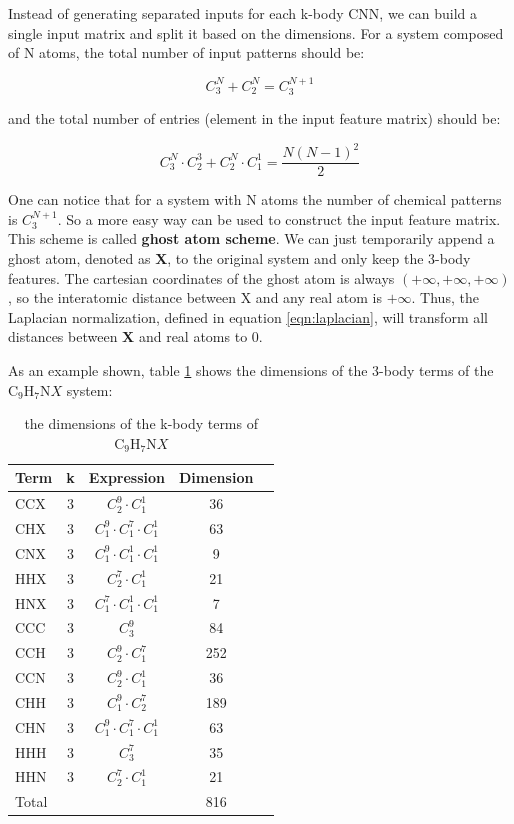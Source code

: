 \noindent Instead of generating separated inputs for each k-body CNN, we can build a single input 
matrix and split it based on the dimensions. For a system composed of N atoms, the total number
of input patterns should be:

\begin{equation}\label{eqn:cn3_cn2}
C^N_3 + C^N_2 = C^{N+1}_3
\end{equation}

\noindent and the total number of entries (element in the input feature matrix) should be:

\begin{equation}
C^N_3 \cdot C^3_2 + C^N_2 \cdot C^1_1 = \frac{N(N-1)^2}{2}
\end{equation}

One can notice that for a system with N atoms the number of chemical patterns is $C^{N+1}_3$.
So a more easy way can be used to construct the input feature matrix. This scheme is called
\textbf{ghost atom scheme}. We can just temporarily append a ghost atom, denoted as 
\textbf{X}, to the original system and only keep the 3-body features. 
The cartesian coordinates of the ghost atom is always $(+\infty, +\infty, +\infty)$, 
so the interatomic distance between X and any real atom is $+\infty$. Thus, the Laplacian 
normalization, defined in equation \ref{eqn:laplacian}, will transform all distances between 
\textbf{X} and real atoms to 0. 

As an example shown, table \ref{tab:table2} shows the 
dimensions of the 3-body terms of the $\mathrm{C}_9 \mathrm{H}_7 \mathrm{N}X$ system: 
\begin{table}[h]
	\center
	\begin{tabular}{l*{3}{c}r}
		Term              & k & Expression & Dimension \\
		\hline
		CCX   & 3 & $C^9_2 \cdot C^1_1$             &  36 \\
		CHX   & 3 & $C^9_1 \cdot C^7_1 \cdot C^1_1$ &  63 \\
		CNX   & 3 & $C^9_1 \cdot C^1_1 \cdot C^1_1$ &   9 \\
		HHX   & 3 & $C^7_2 \cdot C^1_1$             &  21 \\
		HNX   & 3 & $C^7_1 \cdot C^1_1 \cdot C^1_1$ &   7 \\
		CCC   & 3 & $C^9_3$                         &  84 \\
		CCH   & 3 & $C^9_2 \cdot C^7_1$             & 252 \\
		CCN   & 3 & $C^9_2 \cdot C^1_1$             &  36 \\
		CHH   & 3 & $C^9_1 \cdot C^7_2$             & 189 \\
		CHN   & 3 & $C^9_1 \cdot C^7_1 \cdot C^1_1$ &  63 \\
		HHH   & 3 & $C^7_3$                         &  35 \\
		HHN   & 3 & $C^7_2 \cdot C^1_1$             &  21 \\
		Total &   &                                 & 816 
	\end{tabular}	
	\caption{
		the dimensions of the k-body terms of $\mathrm{C}_9 \mathrm{H}_7 \mathrm{N}X$
	}
	\label{tab:table2}
\end{table}

